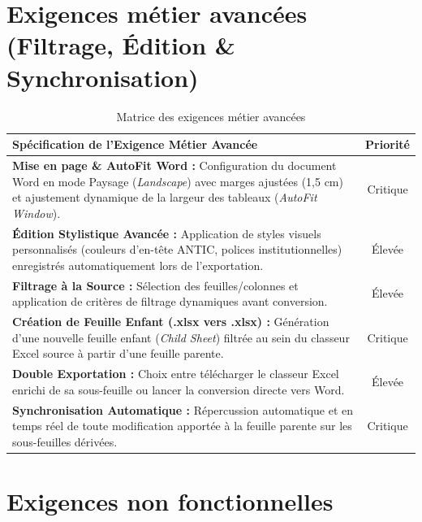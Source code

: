 \section{Exigences métier avancées (Filtrage, Édition \& Synchronisation)}

\begin{table}[H]
\centering
\small
\begin{tabular}{|L{11.5cm}|c|}
\hline
{}
\textbf{Spécification de l'Exigence Métier Avancée} & \textbf{Priorité} \\
\hline
\textbf{Mise en page \& AutoFit Word :} Configuration du document Word en mode Paysage (\textit{Landscape}) avec marges ajustées (1,5 cm) et ajustement dynamique de la largeur des tableaux (\textit{AutoFit Window}). & Critique \\
\hline
\textbf{Édition Stylistique Avancée :} Application de styles visuels personnalisés (couleurs d'en-tête ANTIC, polices institutionnelles) enregistrés automatiquement lors de l'exportation. & Élevée \\
\hline
\textbf{Filtrage à la Source :} Sélection des feuilles/colonnes et application de critères de filtrage dynamiques avant conversion. & Élevée \\
\hline
\textbf{Création de Feuille Enfant (.xlsx vers .xlsx) :} Génération d'une nouvelle feuille enfant (\textit{Child Sheet}) filtrée au sein du classeur Excel source à partir d'une feuille parente. & Critique \\
\hline
\textbf{Double Exportation :} Choix entre télécharger le classeur Excel enrichi de sa sous-feuille ou lancer la conversion directe vers Word. & Élevée \\
\hline
\textbf{Synchronisation Automatique :} Répercussion automatique et en temps réel de toute modification apportée à la feuille parente sur les sous-feuilles dérivées. & Critique \\
\hline
\end{tabular}
\caption{Matrice des exigences métier avancées}
\end{table}

\section{Exigences non fonctionnelles}

